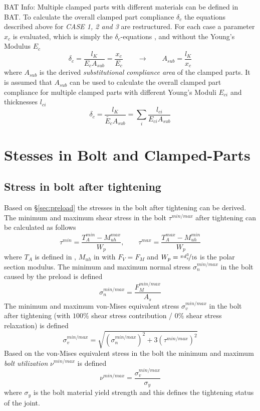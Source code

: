 \begin{colbox}{BAT Info:}
  Multiple clamped parts with different materials can be defined in BAT. To calculate the overall 
  clamped part compliance $\delta_c$ the equations described above for \emph{CASE 1, 2 and 3} are
  restructured. For each case a parameter $x_c$ is evaluated, which is simply the $\delta_c$-equations 
  ,  and  without the Young's Modulus $E_c$
  \begin{equation}
    \delta_c = \frac{l_K}{E_c A_{sub}}=\frac{x_c}{E_c} \qquad \rightarrow \qquad A_{sub}=\frac{l_K}{x_c}
  \end{equation}
  where $A_{sub}$ is the derived \emph{substitutional compliance area} of the clamped parts.
  It is assumed that $A_{sub}$ can be used to calculate the overall clamped part compliance for multiple 
  clamped parts with different Young's Moduli $E_{ci}$ and thicknesses $l_{ci}$
  \begin{equation}
    \delta_c = \frac{l_K}{\tilde{E_c} A_{sub}} = \sum_i \frac{l_{ci}}{E_{ci} A_{sub}}
  \end{equation}
\end{colbox}

\section{Stesses in Bolt and Clamped-Parts}
\subsection{Stress in bolt after tightening}
Based on §\ref{sec:preload} the stresses in the bolt after tightening can be derived. 
The minimum and maximum shear stress in the bolt $\tau^{min/max}$ after tightening can be calculated
as follows
\begin{equation}
  \tau^{min} = \frac{T_A^{min}-M_{uh}^{max}}{W_p} , \qquad \tau^{max} = \frac{T_A^{max}-M_{uh}^{min}}{W_p}
\end{equation}
where $T_A$ is defined in , $M_{uh}$ in  with $F_V=F_M$ and 
$W_p = \nicefrac{\pi d_s^3}{16}$ is the polar section modulus. The minimum and maximum normal 
stress $\sigma_n^{min/max}$ in the bolt caused by the preload is defined
\begin{equation}
  \sigma_n^{min/max} = \frac{F_M^{min/max}}{A_s}
\end{equation}
The minimum and maximum von-Mises equivalent stress $\sigma_v^{min/max}$ in the bolt after tightening
(with $100\%$ shear stress contribution / $0\%$ shear stress relaxation) is defined 
\begin{equation}
  \sigma_v^{min/max} = \sqrt{\left(\sigma_n^{min/max}\right)^2 + 3\left(\tau^{min/max}\right)^2}
\end{equation}
Based on the von-Mises equivalent stress in the bolt the minimum and maximum 
\emph{bolt utilization} $\nu^{min/max}$ is defined
\begin{equation}
  \nu^{min/max} = \frac{\sigma_v^{min/max}}{\sigma_y}
\end{equation}
where $\sigma_y$ is the bolt material yield strength and this defines the tightening status of the joint. 

